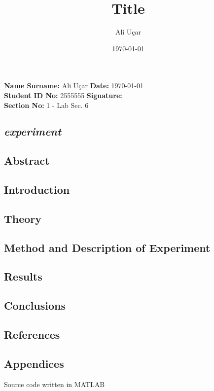\documentclass[a4paper, 12pt]{article}
\newcommand{\head}[1]{\section{\normalsize{\textit{#1}}}}
\newcommand{\subhead}[1]{\subsection{\normalsize{#1}}}
\begin{document}
    \title{Title}
    \author{Ali Uçar}
    \date{\today}

    \noindent
    \textbf{Name Surname:} Ali Uçar
    \hfill \textbf{Date:} \today \\
    \textbf{Student ID No:} 2555555
    \hfill \textbf{Signature:} \\
    \textbf{Section No:} 1 - Lab Sec. 6

    \begin{center}
        \head{experiment}
    \end{center}


    \subhead{Abstract}


    \subhead{Introduction}


    \subhead{Theory}


    \subhead{Method and Description of Experiment}


    \subhead{Results}


    \subhead{Conclusions}


    \subhead{References}


    \subhead{Appendices}
    \noindent
    Source code written in MATLAB

    \clearpage
\end{document}
